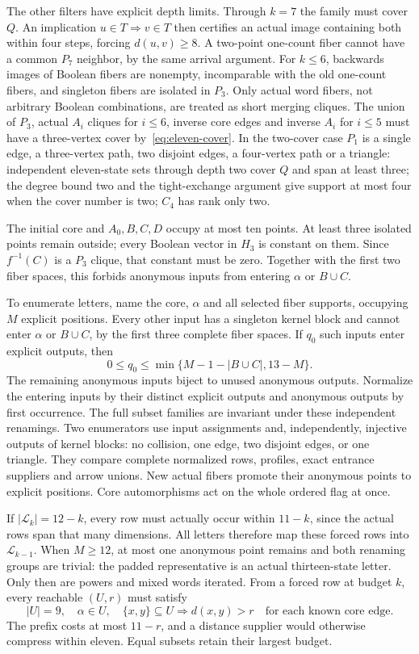 \documentclass[10pt]{article}
\begin{document}
The other filters have explicit depth limits. Through $k=7$ the family
must cover $Q$. An implication $u\in T\Rightarrow v\in T$ then certifies
an actual image containing both within four steps, forcing $d(u,v)\ge8$.
A two-point one-count fiber cannot have a common $P_7$ neighbor, by the same
arrival argument. For $k\le6$, backwards images of Boolean fibers are
nonempty, incomparable with the old one-count fibers, and singleton fibers
are isolated in $P_3$. Only actual word fibers, not arbitrary Boolean
combinations, are treated as short merging cliques. The union of $P_3$,
actual $A_i$ cliques for $i\le6$, inverse core edges and inverse $A_i$
for $i\le5$ must have a three-vertex cover by~\eqref{eq:eleven-cover}.
In the two-cover case $P_1$ is a single edge, a three-vertex path,
two disjoint edges, a four-vertex path or a triangle: independent
eleven-state sets through depth two cover $Q$ and span at least three;
the degree bound two and the tight-exchange argument give support at most
four when the cover number is two; $C_4$ has rank only two.

The initial core and $A_0,B,C,D$ occupy at most ten points. At least three
isolated points remain outside; every Boolean vector in $H_3$ is constant
on them. Since $f^{-1}(C)$ is a $P_3$ clique, that constant must be zero.
Together with the first two fiber spaces, this forbids anonymous inputs
from entering $\alpha$ or $B\cup C$.

To enumerate letters, name the core, $\alpha$ and all selected fiber
supports, occupying $M$ explicit positions. Every other input has a
singleton kernel block and cannot enter $\alpha$ or $B\cup C$, by the
first three complete fiber spaces. If $q_0$ such inputs enter explicit
outputs, then
\[
 0\le q_0\le\min\{M-1-|B\cup C|,13-M\}.
\]
The remaining anonymous inputs biject to unused anonymous outputs.
Normalize the entering inputs by their distinct explicit outputs and
anonymous outputs by first occurrence. The full subset families are
invariant under these independent renamings. Two enumerators use input
assignments and, independently, injective outputs of kernel blocks:
no collision, one edge, two disjoint edges, or one triangle. They compare
complete normalized rows, profiles, exact entrance suppliers and arrow
unions. New actual fibers promote their anonymous points to explicit
positions. Core automorphisms act on the whole ordered flag at once.

If $|\mathcal L_k|=12-k$, every row must actually occur within $11-k$,
since the actual rows span that many dimensions. All letters therefore
map these forced rows into $\mathcal L_{k-1}$. When $M\ge12$, at most one
anonymous point remains and both renaming groups are trivial: the padded
representative is an actual thirteen-state letter. Only then are powers
and mixed words iterated. From a forced row at budget $k$, every reachable
$(U,r)$ must satisfy
\begin{equation}\label{eq:eleven-word}
 |U|=9,\quad\alpha\in U,\quad
 \{x,y\}\subseteq U\Longrightarrow d(x,y)>r
 \quad\text{for each known core edge}.
\end{equation}
The prefix costs at most $11-r$, and a distance supplier would otherwise
compress within eleven. Equal subsets retain their largest budget.
\end{document}
